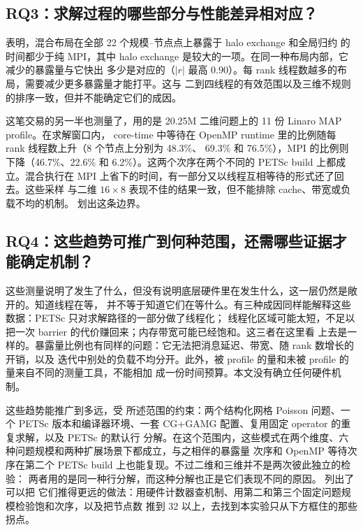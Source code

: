 \documentclass[11pt,a4paper,oneside]{report}
\let\OldSubsection\subsection
\renewcommand{\subsection}{\FloatBarrier\OldSubsection}
\begin{document}
\subsection{RQ3：求解过程的哪些部分与性能差异相对应？}
\label{sec:rq3}
 表明，混合布局在全部 22 个规模--节点点上暴露于 halo exchange 和全局归约
的时间都少于纯 MPI，其中 halo exchange 是较大的一项。在同一种布局内部，它减少的暴露量与它快出
多少是对应的（$|r|$ 最高 $0.90$）。每 rank 线程数越多的布局，需要减少更多暴露量才能打平。这与
二到四线程的有效范围以及三维不规则的排序一致，但并不能确定它们的成因。

这笔交易的另一半也测量了，用的是 20.25M 二维问题上的 11 份 Linaro MAP profile。在求解窗口内，
core-time 中等待在 OpenMP runtime 里的比例随每 rank 线程数上升（8 个节点上分别为 48.3\%、
69.3\% 和 76.5\%），MPI 的比例则下降（46.7\%、22.6\% 和 6.2\%）。这两个次序在两个不同的 PETSc
build 上都成立。混合执行在 MPI 上省下的时间，有一部分又以线程互相等待的形式还了回去。这些采样
与二维 $16\times8$ 表现不佳的结果一致，但不能排除 cache、带宽或负载不均的机制。
划出这条边界。

\subsection{RQ4：这些趋势可推广到何种范围，还需哪些证据才能确定机制？}
\label{sec:rq4}
这些测量说明了发生了什么，但没有说明底层硬件里在发生什么，这一层仍然是敞开的。知道线程在等，
并不等于知道它们在等什么。有三种成因同样能解释这些数据：PETSc 只对求解路径的一部分做了线程化；
线程化区域可能太短，不足以把一次 barrier 的代价赚回来；内存带宽可能已经饱和。这三者在这里看
上去是一样的。暴露量比例也有同样的问题：它无法把消息延迟、带宽、随 rank 数增长的开销，以及
迭代中别处的负载不均分开。此外，被 profile 的量和未被 profile 的量来自不同的测量工具，不能相加
成一份时间预算。本文没有确立任何硬件机制。

这些趋势能推广到多远，受  所述范围的约束：两个结构化网格 Poisson 问题、一个
PETSc 版本和编译器环境、一套 CG+GAMG 配置、复用固定 operator 的重复求解，以及 PETSc 的默认行
分解。在这个范围内，这些模式在两个维度、六种问题规模和两种扩展场景下都成立，与之相伴的暴露量
次序和 OpenMP 等待次序在第二个 PETSc build 上也能复现。不过二维和三维并不是两次彼此独立的检验：
两者用的是同一种行分解，而这种分解也正是它们表现不同的原因。 列出了可以把
它们推得更远的做法：用硬件计数器查机制、用第二和第三个固定问题规模检验饱和次序，以及把节点数
推到 32 以上，去找到本实验只从下方框住的那些拐点。
\end{document}
